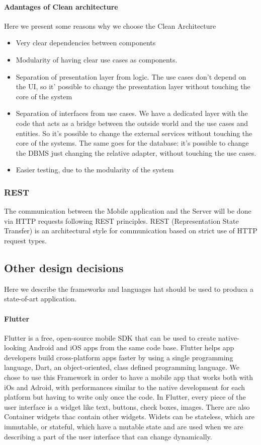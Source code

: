 \paragraph{Adantages of Clean architecture}
Here we present some reasons why we choose the Clean Architecture
\begin{itemize}
  \item Very clear dependencies between components
  \item Modularity of having clear use cases as components.
  \item Separation of presentation layer from logic. The use cases don't depend on the UI, so it' possible to change the presentation layer without touching the core of the system
  \item Separation of interfaces from use cases. We have a dedicated layer with the code that acts as a bridge between the outside world and the use cases and entities. So it's possible to change the external services without touching the core of the systems. The same goes for the database: it's possible to change the DBMS just changing the relative adapter, without touching the use cases.
  \item Easier testing, due to the modularity of the system
\end{itemize}

\subsubsection{REST}
The communication between the Mobile application and the Server will be done via HTTP requests following REST principles. REST (Representation State Transfer) is an architectural style for communication based on strict use of HTTP request types.



\subsection{Other design decisions}
Here we describe the frameworks and languages hat should be used to produca a state-of-art application.

\paragraph{Flutter}
Flutter is a free, open-source mobile SDK that can be used to create native-looking Android and iOS apps from the same code base. Flutter helps app developers build cross-platform apps faster by using a single programming language, Dart, an object-oriented, class defined programming language.
We chose to use this Framework in order to have a mobile app that works both with iOs and Adroid, with performances similar to the native development for each platform but having to write only once the code.
In Flutter, every piece of the user interface is a widget like text, buttons, check boxes, images. There are also Container widgets thac contain other widgets. Widets can be stateless, which are immutable, or stateful, which have a mutable state and are used when we are describing a part of the user interface that can change dynamically.

